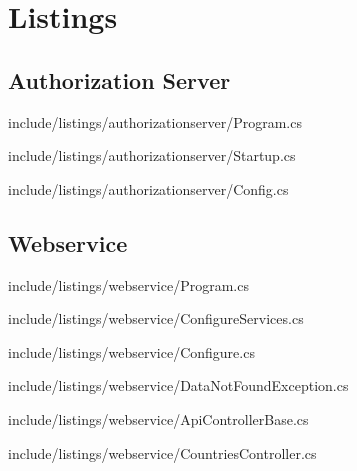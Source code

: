 \chapter{Listings}\label{ch:listings}


	\section{Authorization Server}\label{sec:authorization-server}

		
		{include/listings/authorizationserver/Program.cs}

		
		{include/listings/authorizationserver/Startup.cs}

		
		{include/listings/authorizationserver/Config.cs}

		\pagebreak


	\section{Webservice}\label{sec:webservice}

		
		{include/listings/webservice/Program.cs}

		
		{include/listings/webservice/ConfigureServices.cs}

		
		{include/listings/webservice/Configure.cs}

		
		{include/listings/webservice/DataNotFoundException.cs}

		
		{include/listings/webservice/ApiControllerBase.cs}

		
		{include/listings/webservice/CountriesController.cs}

